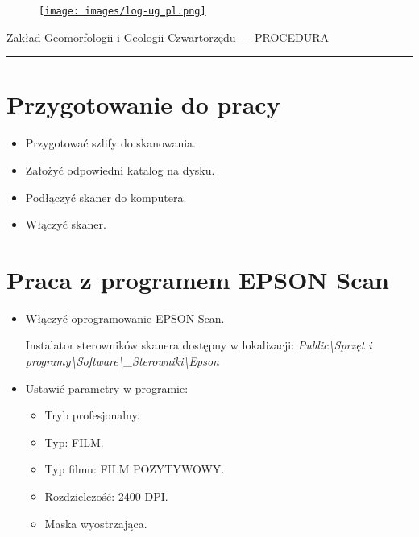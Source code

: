 \documentclass[
  letterpaper,
  DIV=11,
  numbers=noendperiod]{scrreprt}
\begin{document}
\begin{figure}

\href{https://geomorfologia.ug.edu.pl}{\texttt{[image: images/log-ug\_pl.png]}}

\end{figure}

Zakład Geomorfologii i Geologii Czwartorzędu --- PROCEDURA

\begin{center}\rule{0.5\linewidth}{0.5pt}\end{center}

\hypertarget{przygotowanie-do-pracy-6}{%
\section{Przygotowanie do pracy}\label{przygotowanie-do-pracy-6}}

\begin{itemize}
\item
  Przygotować szlify do skanowania.
\item
  Założyć odpowiedni katalog na dysku.
\item
  Podłączyć skaner do komputera.
\item
  Włączyć skaner.
\end{itemize}

\hypertarget{praca-z-programem-epson-scan}{%
\section{Praca z programem EPSON
Scan}\label{praca-z-programem-epson-scan}}

\begin{itemize}
\item
  Włączyć oprogramowanie EPSON Scan.

  Instalator sterowników skanera dostępny w lokalizacji:
  \emph{Public\textbackslash Sprzęt i
  programy\textbackslash Software\textbackslash\_Sterowniki\textbackslash Epson}
\item
  Ustawić parametry w programie:

  \begin{itemize}
  \item
    Tryb profesjonalny.
  \item
    Typ: FILM.
  \item
    Typ filmu: FILM POZYTYWOWY.
  \item
    Rozdzielczość: 2400 DPI.
  \item
    Maska wyostrzająca.
  \end{itemize}
\end{itemize}
\end{document}
